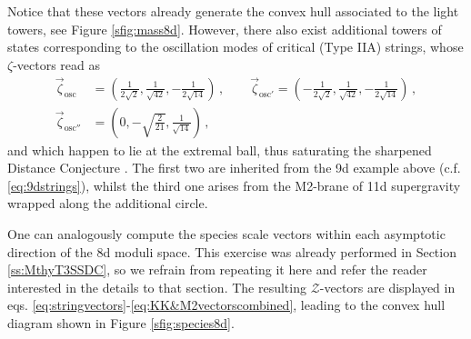 Notice that these vectors already generate the convex hull associated to the light towers, see Figure \ref{sfig:mass8d}. However, there also exist additional towers of states corresponding to the oscillation modes of critical (Type IIA) strings, whose $\zeta$-vectors read as
%
\begin{equation} \label{eq:stringvectorspattern}
	\begin{split} 
		\vec{\zeta}_{\text{osc}} &= \left( \frac{1}{2\sqrt{2}} , \frac{1}{\sqrt{42}}, -\frac{1}{2 \sqrt{14}} \right) \, , \qquad \vec{\zeta}_{\text{osc}'} = \left( -\frac{1}{2\sqrt{2}} , \frac{1}{\sqrt{42}}, -\frac{1}{2 \sqrt{14}} \right) \, ,\\
		\vec{\zeta}_{\text{osc}''} &= \left( 0 , -\sqrt{\frac{2}{21}}, \frac{1}{\sqrt{14}} \right)  \, ,
	\end{split}
\end{equation}
%
and which happen to lie at the extremal ball, thus saturating the sharpened Distance Conjecture \cite{Etheredge:2022opl}. The first two are inherited from the 9d example above (c.f. \eqref{eq:9dstrings}), whilst the third one arises from the M2-brane of 11d supergravity wrapped along the additional circle.
	
One can analogously compute the species scale vectors within each asymptotic direction of the 8d moduli space. This exercise was already performed in Section \ref{ss:MthyT3SSDC}, so we refrain from repeating it here and refer the reader interested in the details to that section. The resulting $\mathcal{Z}$-vectors are displayed in eqs. \eqref{eq:stringvectors}-\eqref{eq:KK&M2vectorscombined}, leading to the convex hull diagram shown in Figure \ref{sfig:species8d}. 

